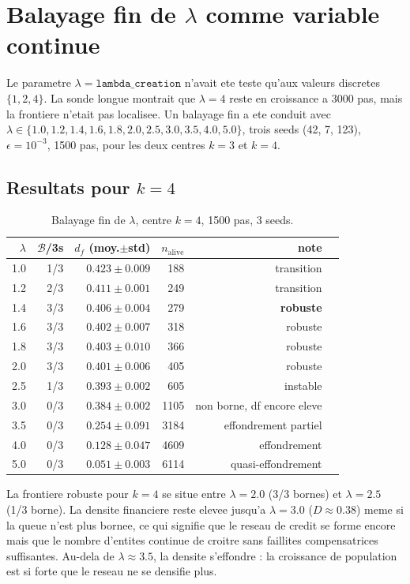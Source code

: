 \documentclass[11pt,a4paper]{article}
\begin{document}
\section{Balayage fin de \(\lambda\) comme variable continue}
\label{sec:lambda-fin}

Le parametre \(\lambda=\texttt{lambda\_creation}\) n'avait ete teste qu'aux
valeurs discretes \(\{1, 2, 4\}\). La sonde longue montrait que \(\lambda=4\)
reste en croissance a 3000 pas, mais la frontiere n'etait pas localisee. Un
balayage fin a ete conduit avec
\(\lambda\in\{1.0, 1.2, 1.4, 1.6, 1.8, 2.0, 2.5, 3.0, 3.5, 4.0, 5.0\}\),
trois seeds (42, 7, 123), \(\epsilon=10^{-3}\), 1500 pas, pour les deux centres
\(k=3\) et \(k=4\).

\subsection*{Resultats pour \(k=4\)}

\begin{table}[H]
\centering
\small
\begin{tabular}{rrrrrr}
\toprule
\(\lambda\) & $\mathcal{B}$/3s & $d_f$ (moy.$\pm$std) & \(n_{\mathrm{alive}}\) & note \\
\midrule
1.0 & 1/3 & \(0.423\pm0.009\) & 188 & transition \\
1.2 & 2/3 & \(0.411\pm0.001\) & 249 & transition \\
1.4 & 3/3 & \(0.406\pm0.004\) & 279 & \textbf{robuste} \\
1.6 & 3/3 & \(0.402\pm0.007\) & 318 & robuste \\
1.8 & 3/3 & \(0.403\pm0.010\) & 366 & robuste \\
2.0 & 3/3 & \(0.401\pm0.006\) & 405 & robuste \\
2.5 & 1/3 & \(0.393\pm0.002\) & 605 & instable \\
3.0 & 0/3 & \(0.384\pm0.002\) & 1105 & non borne, df encore eleve \\
3.5 & 0/3 & \(0.254\pm0.091\) & 3184 & effondrement partiel \\
4.0 & 0/3 & \(0.128\pm0.047\) & 4609 & effondrement \\
5.0 & 0/3 & \(0.051\pm0.003\) & 6114 & quasi-effondrement \\
\bottomrule
\end{tabular}
\caption{Balayage fin de \(\lambda\), centre \(k=4\), 1500 pas, 3 seeds.}
\end{table}

La frontiere robuste pour \(k=4\) se situe entre \(\lambda=2.0\) (3/3 bornes)
et \(\lambda=2.5\) (1/3 borne). La densite financiere reste elevee jusqu'a
\(\lambda=3.0\) (\(D\approx0.38\)) meme si la queue n'est plus bornee, ce
qui signifie que le reseau de credit se forme encore mais que le nombre
d'entites continue de croitre sans faillites compensatrices suffisantes.
Au-dela de \(\lambda\approx3.5\), la densite s'effondre : la croissance de
population est si forte que le reseau ne se densifie plus.
\end{document}

